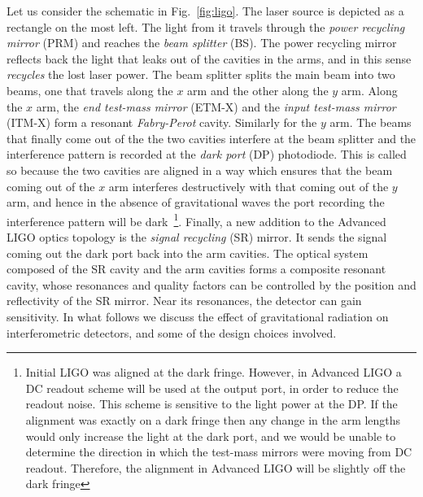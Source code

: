 Let us consider the schematic in Fig.~\ref{fig:ligo}. The laser source is 
depicted as a rectangle on the most left. The light from it travels through 
the {\it power recycling mirror} (PRM) and reaches the {\it beam 
splitter} (BS). The power recycling mirror reflects back the light 
that leaks out of the cavities in the arms, and in this sense {\it recycles}
the lost laser power. 
The beam splitter splits the main beam into two beams, one that travels along 
the $x$ arm and the other along the $y$ arm. Along the $x$ arm, the {\it end 
test-mass mirror} (ETM-X) and the {\it input test-mass mirror} (ITM-X) form a 
resonant {\it Fabry-Perot} cavity. Similarly for the $y$ arm.
The beams that finally come out of the the two cavities interfere at the beam
splitter and the interference pattern is recorded at the {\it dark port} (DP)
photodiode. This is called so because the two cavities are aligned in a way 
which ensures that the beam coming out of the $x$ arm interferes destructively
with that coming out of the $y$ arm, and hence in the absence of 
gravitational waves the port recording the interference pattern will be 
dark~\footnote{Initial LIGO was aligned at the dark fringe. However, in Advanced
LIGO a DC readout scheme will be used at the output port, 
in order to reduce the readout noise. 
This scheme is sensitive to the light power at the DP.
If the alignment was exactly on a dark fringe then any change in 
the arm lengths would only increase the light at the dark port, and we
would be unable to determine the direction in which the test-mass mirrors were
moving from DC readout. Therefore, the alignment in Advanced LIGO will be
slightly off the dark fringe}.
% 
Finally, a new addition to the Advanced LIGO optics topology is the {\it signal
recycling} (SR) mirror. It sends the signal coming out the dark port back into 
the arm cavities.
The optical system composed of the SR cavity and the arm
cavities forms a
composite resonant cavity, whose resonances and quality
factors can be controlled by the position and
reflectivity of the SR mirror. 
Near its resonances, the detector can gain sensitivity. 
% 
In what follows we discuss the effect of gravitational radiation on 
interferometric detectors, and some of the design choices involved.


